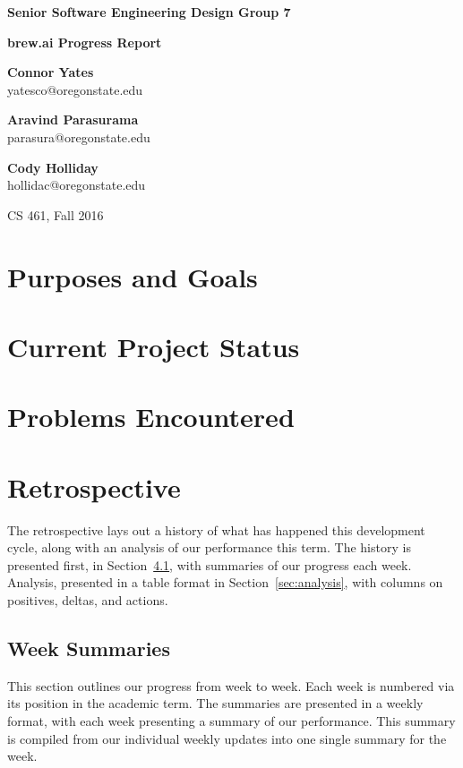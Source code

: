 \documentclass[draftclsnofoot,onecolumn,letterpaper,10pt]{IEEEtran}
\begin{document}
\begin{center}
	{\huge\textbf{Senior Software Engineering Design Group 7}}
	\vspace{1cm}

	{\Huge\textbf{brew.ai Progress Report}}

	\vspace{2cm}
	\textbf{Connor Yates}\\yatesco@oregonstate.edu

	\textbf{Aravind Parasurama}\\parasura@oregonstate.edu

	\textbf{Cody Holliday}\\hollidac@oregonstate.edu

	\vspace{2cm}
	{\Large CS 461, Fall 2016}
	\vspace{1cm}
\end{center}

\begin{abstract}

\end{abstract}

\newpage
\tableofcontents
\newpage

\section{Purposes and Goals}%

\section{Current Project Status}%

\section{Problems Encountered}%

\section{Retrospective}
The retrospective lays out a history of what has happened this development cycle, along with an analysis of our performance this term.
The history is presented first, in Section~\ref{sec:weekSummaries}, with summaries of our progress each week.
Analysis, presented in a table format in Section~\ref{sec:analysis}, with columns on positives, deltas, and actions.

\subsection{Week Summaries}\label{sec:weekSummaries}
This section outlines our progress from week to week.
Each week is numbered via its position in the academic term.
The summaries are presented in a weekly format, with each week presenting a summary of our performance.
This summary is compiled from our individual weekly updates into one single summary for the week. %
\end{document}
